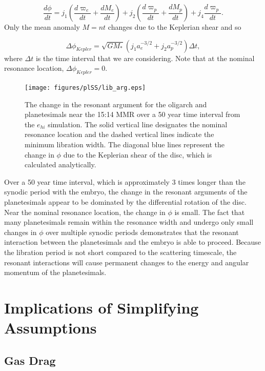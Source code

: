 \begin{equation}\label{eq:res_arg1}
    \frac{d \phi}{dt} = j_{1} \left( \frac{d \varpi_{e}}{dt} + \frac{d M_{e}}{dt} \right) + j_{2} \left( \frac{d \varpi_{p}}{dt} + \frac{d M_{p}}{dt} \right) + j_{4} \frac{d \varpi_{p}}{dt}.
\end{equation} Only the mean anomaly $M = n t$ changes due to the Keplerian shear and so

\begin{equation}
    \Delta \phi_{Kepler} = \sqrt{G M_{*}} \left( j_{1} a_{e}^{-3/2} + j_{2} a_{p}^{-3/2} \right) \Delta t,
\end{equation} where $\Delta t$ is the time interval that we are considering. Note that at the nominal resonance location, $\Delta \phi_{Kepler} = 0$.

\begin{figure}
    \texttt{[image: figures/plSS/lib\_arg.eps]}
    \caption{The change in the resonant argument for the oligarch and planetesimals near the 15:14 MMR over a 50 year time 
    interval from the $e_{hi}$ simulation. The solid vertical line designates the nominal resonance location and the dashed vertical 
    lines indicate the minimum libration width. The diagonal blue lines represent the change in $\phi$ due to the Keplerian shear 
    of the disc, which is calculated analytically.}
    \label{fig:lib_arg}
\end{figure}

Over a 50 year time interval, which is approximately 3 times longer than the synodic period with the embryo, the change in the 
resonant arguments of the planetesimals appear to be dominated by the differential rotation of the disc. Near the nominal 
resonance location, the change in $\phi$ is small. The fact that many planetesimals remain within the resonance width and 
undergo only small changes in $\phi$ over multiple synodic periods demonstrates that the resonant interaction between the 
planetesimals and the embryo is able to proceed. Because the libration period is not short compared to the scattering timescale, 
the resonant interactions will cause permanent changes to the energy and angular momentum of the planetesimals.

\section{Implications of Simplifying Assumptions}\label{sec:assumptions}

\subsection{Gas Drag}

